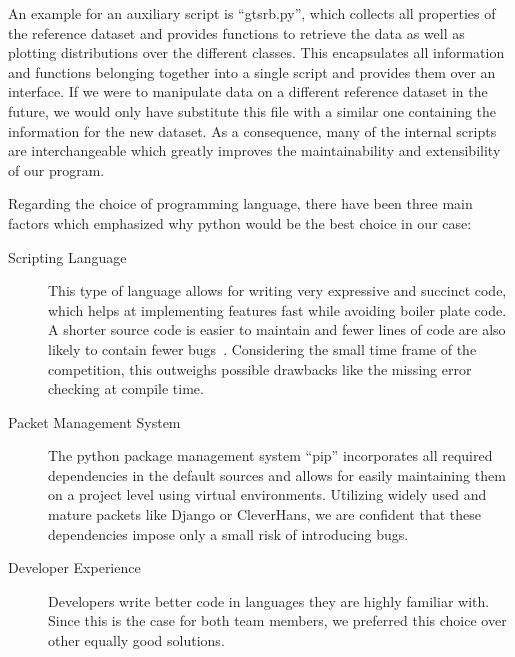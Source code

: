 An example for an auxiliary script is \enquote{gtsrb.py}, which collects all properties of the reference dataset and provides functions to retrieve the data as well as plotting distributions over the different classes.
This encapsulates all information and functions belonging together into a single script and provides them over an interface.
If we were to manipulate data on a different reference dataset in the future, we would only have substitute this file with a similar one containing the information for the new dataset.
As a consequence, many of the internal scripts are interchangeable which greatly improves the maintainability and extensibility of our program.

Regarding the choice of programming language, there have been three main factors which emphasized why python would be the best choice in our case:
\begin{description}
	\item[Scripting Language] This type of language allows for writing very expressive and succinct code, which helps at implementing features fast while avoiding boiler plate code. 
	A shorter source code is easier to maintain and fewer lines of code are also likely to contain fewer bugs~\cite{jain2017clairvoyant}. 
	Considering the small time frame of the competition, this outweighs possible drawbacks like the missing error checking at compile time.
	\item[Packet Management System] The python package management system \enquote{pip} incorporates all required dependencies in the default sources and allows for easily maintaining them on a project level using virtual environments. 
	Utilizing widely used  and mature packets like Django or CleverHans, we are confident that these dependencies impose only a small risk of introducing bugs.
	\item[Developer Experience] Developers write better code in languages they are highly familiar with.
	Since this is the case for both team members, we preferred this choice over other equally good solutions.
\end{description}


